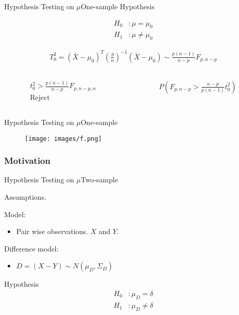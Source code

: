 \documentclass[aspectratio=169,10pt,t]{beamer}
\begin{document}
\begin{frame}{Hypothesis Testing on $\mu$}{One-sample}
	Hypothesis

	\begin{align*}
		H_0&: \mu = \mu_0\\
		H_1&: \mu \neq \mu_0
	\end{align*}

	\begin{align*}
		T^2_0 = ( \bar{X} - \mu_0)^{T} \left(\frac{S}{n}\right)^{-1} ( \bar{X} -\mu_0 ) \sim \frac{p(n-1)}{n-p} F_{p,n-p}
	\end{align*}

	\begin{columns}
		\begin{column}{0.5\textwidth}
			\begin{align*}
				t^2_0 > \frac{p(n-1)}{n-p} F_{p,n-p,\alpha } \\
				\text{Reject}
			\end{align*}
		\end{column}
		\begin{column}{0.5\textwidth}
			\begin{align*}
				P( F_{p,n-p} > \frac{n-p}{p(n-1)} t_0^2 )
			\end{align*}
		\end{column}
	\end{columns}



\end{frame}

\begin{frame}{Hypothesis Testing on $\mu$}{One-sample}
	\begin{figure}[H]
		\centering
		\texttt{[image: images/f.png]}
	\end{figure} 
\end{frame}

\begin{frame}[t]
	\frametitle{Motivation}

\end{frame}

\begin{frame}{Hypothesis Testing on $\mu$}{Two-sample}

	Assumptions.

	Model:
	\begin{itemize}
		\item Pair wise observations. $X$ and $Y$.
	\end{itemize}

	Difference model:
	\begin{itemize}
		\item 
			$ D =   \left( X - Y  \right)  \sim N \left( \mu_D, \Sigma_D  \right)  $
	\end{itemize}

	Hypothesis
	\begin{align*}
		H_0&: \mu_D = \delta\\
		H_1&: \mu_D \neq \delta
	\end{align*}

\end{frame}
\end{document}

